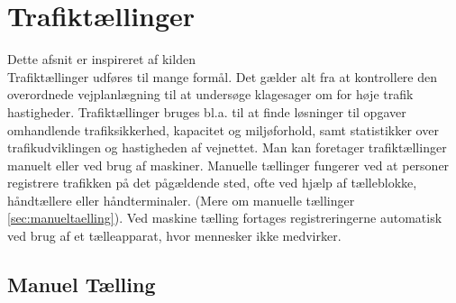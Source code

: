 \section{Trafiktællinger}
\label{sec:trafiktaellinger}

Dette afsnit er inspireret af kilden %
\\
Trafiktællinger udføres til mange formål. Det gælder alt fra at kontrollere den overordnede vejplanlægning
til at undersøge klagesager om for høje trafik hastigheder. Trafiktællinger bruges bl.a. til at finde løsninger
til opgaver omhandlende trafiksikkerhed, kapacitet og miljøforhold, samt statistikker over trafikudviklingen
og hastigheden af vejnettet. Man kan foretager trafiktællinger manuelt eller ved brug af maskiner.
Manuelle tællinger fungerer ved at personer registrere trafikken på det pågældende sted, ofte ved hjælp af
tælleblokke, håndtællere eller håndterminaler. (Mere om manuelle tællinger \cref{sec:manueltaelling}). Ved maskine
tælling fortages registreringerne automatisk ved brug af et tælleapparat, hvor mennesker ikke medvirker.
\subsection{Manuel Tælling}
\label{subs:manueltaelling}

